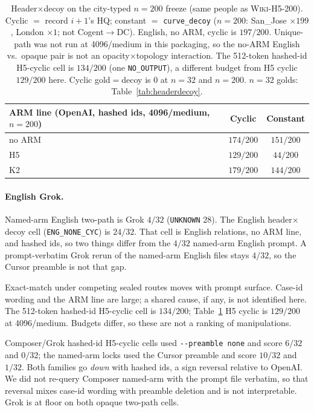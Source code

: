 \documentclass{article}
\begin{document}
\begin{table}[htbp]
\centering
\small
\begin{tabular}{@{}lcc@{}}
\toprule
ARM line (OpenAI, hashed ids, 4096/medium, $n{=}200$) & Cyclic & Constant \\
\midrule
no ARM & $174/200$ & $151/200$ \\
H5 & $129/200$ & $44/200$ \\
K2 & $179/200$ & $144/200$ \\
\bottomrule
\end{tabular}
\caption{Header$\times$decoy on the city-typed $n{=}200$ freeze (same people
as \textsc{Wiki-H5-200}).
Cyclic $=$ record $i{+}1$'s HQ; constant $=$ \texttt{curve\_decoy}
($n{=}200$: San\_Jose ${\times}199$, London ${\times}1$; not Cogent$\to$DC).
English, no ARM, cyclic is $197/200$.
Unique-path was not run at 4096/medium in this packaging, so the no-ARM
English vs.\ opaque pair is not an opacity$\times$topology interaction.
The 512-token hashed-id H5-cyclic cell is $134/200$ (one
\texttt{NO\_OUTPUT}), a different budget from H5 cyclic $129/200$ here.
Cyclic gold$=$decoy is $0$ at $n{=}32$ and $n{=}200$.
$n{=}32$ golds: Table~\ref{tab:headerdecoy}.}
\label{tab:headerdecoy200}
\end{table}

\paragraph{English Grok.}
Named-arm English two-path is Grok $4/32$ (\texttt{UNKNOWN} $28$).
The English header$\times$decoy cell (\texttt{ENG\_NONE\_CYC}) is $24/32$.
That cell is English relations, no ARM line, and hashed ids, so two things
differ from the $4/32$ named-arm English prompt.
A prompt-verbatim Grok rerun of the named-arm English files
stays $4/32$, so the Cursor preamble is not that gap.

Exact-match under competing sealed routes moves with prompt surface.
Case-id wording and the ARM line are large; a shared cause, if any, is
not identified here.
The 512-token hashed-id H5-cyclic cell is $134/200$; Table~\ref{tab:headerdecoy200}
H5 cyclic is $129/200$ at 4096/medium.
Budgets differ, so these are not a ranking of manipulations.

Composer/Grok hashed-id H5-cyclic cells used \texttt{{-}-preamble none} and
score $6/32$ and $0/32$; the named-arm locks used the Cursor preamble and
score $10/32$ and $1/32$.
Both families go \emph{down} with hashed ids, a sign reversal relative to
OpenAI.
We did not re-query Composer named-arm with the prompt file verbatim, so
that reversal mixes case-id wording with preamble deletion and is not
interpretable. Grok is at floor on both opaque two-path cells.
\end{document}
